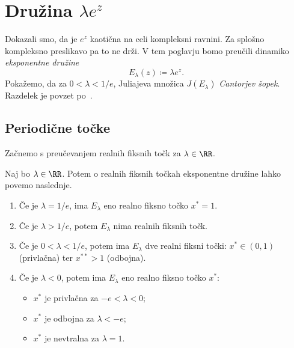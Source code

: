 \section{Družina \texorpdfstring{\(\lambda e^z\)}{\lambda exp(z)}}

Dokazali smo, da je \(e^z\) kaotična na celi kompleksni ravnini. Za splošno kompleksno preslikavo pa to ne drži. V tem poglavju bomo preučili dinamiko \emph{eksponentne družine}
\[E_\lambda (z) \coloneq \lambda e^z.\]
Pokažemo, da za \(0 < \lambda < 1/e\), Juliajeva množica \(J (E_\lambda)\) \emph{Cantorjev šopek}. Razdelek je povzet po~\cite[razdelek 9]{Pineiro_2025}.

\subsection{Periodične točke}

Začnemo s preučevanjem realnih fiksnih točk za \(\lambda \in \RR\).

\begin{trditev}
    Naj bo \(\lambda \in \RR\). Potem o realnih fiksnih točkah eksponentne družine lahko povemo naslednje.
    \begin{enumerate}[label=(\arabic*)]
        \item Če je \(\lambda = 1/e\), ima \(E_\lambda\) eno realno fiksno točko \(x^* = 1\).
        \item Če je \(\lambda > 1/e\), potem \(E_\lambda\) nima realnih fiksnih točk.
        \item Če je \(0 < \lambda < 1/e\), potem ima \(E_\lambda\) dve realni fiksni točki: \(x^* \in (0, 1)\) (privlačna) ter \(x^{**} > 1\) (odbojna).
        \item Če je \(\lambda < 0\), potem ima \(E_\lambda\) eno realno fiksno točko \(x^*\):
            \begin{itemize}
                \item \(x^*\) je privlačna za \(-e < \lambda < 0\);
                \item \(x^*\) je odbojna za \(\lambda < -e\);
                \item \(x^*\) je nevtralna za \(\lambda = 1\).
            \end{itemize}
    \end{enumerate}
\end{trditev}

